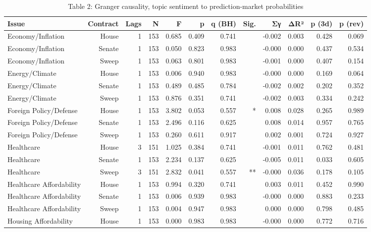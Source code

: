 \begin{table}[htbp]
\centering
\caption{Table 2: Granger causality, topic sentiment to prediction-market probabilities}
\label{tab:table2_granger_stage1}
\small
\begin{tabular}{lrrrrrrrrrrr}
\toprule
Issue & Contract & Lags & N & F & p & q (BH) & Sig. & Σγ & ΔR² & p (3d) & p (rev) \\
\midrule
Economy/Inflation & House & 1 & 153 & 0.685 & 0.409 & 0.741 &  & -0.002 & 0.003 & 0.428 & 0.069 \\
Economy/Inflation & Senate & 1 & 153 & 0.050 & 0.823 & 0.983 &  & -0.000 & 0.000 & 0.437 & 0.534 \\
Economy/Inflation & Sweep & 1 & 153 & 0.063 & 0.801 & 0.983 &  & -0.001 & 0.000 & 0.407 & 0.154 \\
Energy/Climate & House & 1 & 153 & 0.006 & 0.940 & 0.983 &  & -0.000 & 0.000 & 0.169 & 0.064 \\
Energy/Climate & Senate & 1 & 153 & 0.489 & 0.485 & 0.784 &  & -0.002 & 0.002 & 0.202 & 0.352 \\
Energy/Climate & Sweep & 1 & 153 & 0.876 & 0.351 & 0.741 &  & -0.002 & 0.003 & 0.334 & 0.242 \\
Foreign Policy/Defense & House & 1 & 153 & 3.802 & 0.053 & 0.557 & * & 0.008 & 0.028 & 0.265 & 0.989 \\
Foreign Policy/Defense & Senate & 1 & 153 & 2.496 & 0.116 & 0.625 &  & 0.008 & 0.014 & 0.957 & 0.765 \\
Foreign Policy/Defense & Sweep & 1 & 153 & 0.260 & 0.611 & 0.917 &  & 0.002 & 0.001 & 0.724 & 0.927 \\
Healthcare & House & 3 & 151 & 1.025 & 0.384 & 0.741 &  & -0.001 & 0.011 & 0.762 & 0.481 \\
Healthcare & Senate & 1 & 153 & 2.234 & 0.137 & 0.625 &  & -0.005 & 0.011 & 0.033 & 0.605 \\
Healthcare & Sweep & 3 & 151 & 2.832 & 0.041 & 0.557 & ** & -0.000 & 0.036 & 0.178 & 0.105 \\
Healthcare Affordability & House & 1 & 153 & 0.994 & 0.320 & 0.741 &  & 0.003 & 0.011 & 0.452 & 0.990 \\
Healthcare Affordability & Senate & 1 & 153 & 0.006 & 0.939 & 0.983 &  & -0.000 & 0.000 & 0.883 & 0.233 \\
Healthcare Affordability & Sweep & 1 & 153 & 0.004 & 0.947 & 0.983 &  & 0.000 & 0.000 & 0.798 & 0.485 \\
Housing Affordability & House & 1 & 153 & 0.000 & 0.983 & 0.983 &  & -0.000 & 0.000 & 0.772 & 0.716 \\

\end{tabular}
\end{table}

